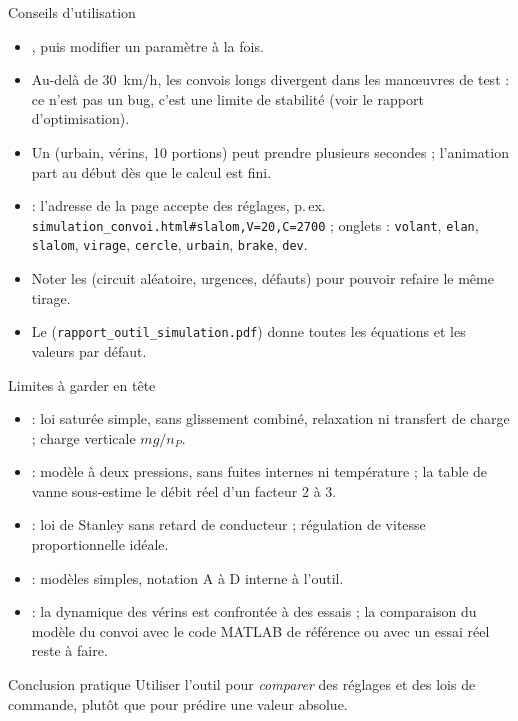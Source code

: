 \documentclass[aspectratio=169,9pt]{beamer}
\begin{document}
\begin{frame}{Conseils d'utilisation}
  \begin{itemize}
    \item {}, puis modifier un paramètre à la fois.
    \item Au-delà de \SI{30}{km/h}, les convois longs divergent dans les manœuvres de test : ce n'est pas un bug, c'est une limite de stabilité (voir le rapport d'optimisation).
    \item Un  (urbain, vérins, 10 portions) peut prendre plusieurs secondes ; l'animation part au début dès que le calcul est fini.
    \item {} : l'adresse de la page accepte des réglages, p.\,ex. \texttt{simulation\_convoi.html\#slalom,V=20,C=2700} ; onglets : \texttt{volant}, \texttt{elan}, \texttt{slalom}, \texttt{virage}, \texttt{cercle}, \texttt{urbain}, \texttt{brake}, \texttt{dev}.
    \item Noter les  (circuit aléatoire, urgences, défauts) pour pouvoir refaire le même tirage.
    \item Le  (\texttt{rapport\_outil\_simulation.pdf}) donne toutes les équations et les valeurs par défaut.
  \end{itemize}
\end{frame}

\begin{frame}{Limites à garder en tête}
  \begin{itemize}
    \item {} : loi saturée simple, sans glissement combiné, relaxation ni transfert de charge ; charge verticale $mg/n_P$.
    \item {} : modèle à deux pressions, sans fuites internes ni température ; la table de vanne sous-estime le débit réel d'un facteur 2 à 3.
    \item {} : loi de Stanley sans retard de conducteur ; régulation de vitesse proportionnelle idéale.
    \item {} : modèles simples, notation A à D interne à l'outil.
    \item {} : la dynamique des vérins est confrontée à des essais ; la comparaison du modèle du convoi avec le code MATLAB de référence ou avec un essai réel reste à faire.
  \end{itemize}
  \begin{alertblock}{Conclusion pratique}
    Utiliser l'outil pour \emph{comparer} des réglages et des lois de commande, plutôt que pour prédire une valeur absolue.
  \end{alertblock}
\end{frame}
\end{document}
